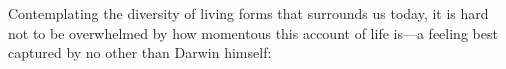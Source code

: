 \bigskip

Contemplating the diversity of living forms that surrounds us today, it is hard
not to be overwhelmed by how momentous this account of life is---a feeling best
captured by no other than Darwin himself:\cite{darwin_origin_1864}










